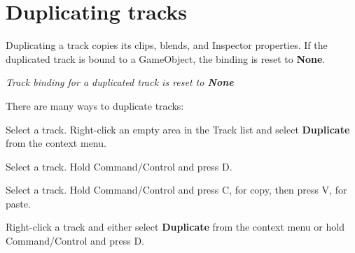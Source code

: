\chapter{Duplicating tracks}
\hypertarget{md__hey_tea_9_2_library_2_package_cache_2com_8unity_8timeline_0d1_87_85_2_documentation_0i_2trk__dup}{}\label{md__hey_tea_9_2_library_2_package_cache_2com_8unity_8timeline_0d1_87_85_2_documentation_0i_2trk__dup}
\label{md__hey_tea_9_2_library_2_package_cache_2com_8unity_8timeline_0d1_87_85_2_documentation_0i_2trk__dup_autotoc_md4758}%
%
 Duplicating a track copies its clips, blends, and Inspector properties. If the duplicated track is bound to a Game\+Object, the binding is reset to {\bfseries{None}}.



{\itshape Track binding for a duplicated track is reset to {\bfseries{None}}}

There are many ways to duplicate tracks\+:


\begin{DoxyItemize}
\item Select a track. Right-\/click an empty area in the Track list and select {\bfseries{Duplicate}} from the context menu.
\item Select a track. Hold Command/\+Control and press D.
\item Select a track. Hold Command/\+Control and press C, for copy, then press V, for paste.
\item Right-\/click a track and either select {\bfseries{Duplicate}} from the context menu or hold Command/\+Control and press D. 
\end{DoxyItemize}